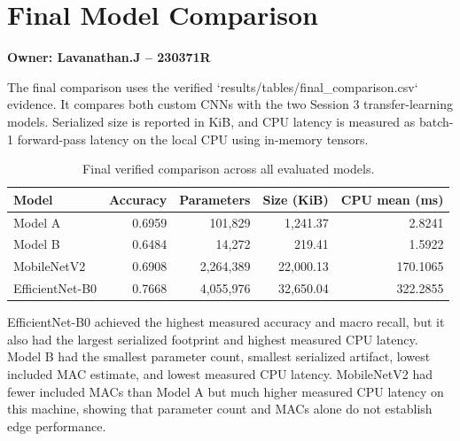 \section{Final Model Comparison}
\textbf{Owner: Lavanathan.J -- 230371R}

The final comparison uses the verified `results/tables/final_comparison.csv` evidence. It compares both custom CNNs with the two Session 3 transfer-learning models. Serialized size is reported in KiB, and CPU latency is measured as batch-1 forward-pass latency on the local CPU using in-memory tensors.

\begin{table}[H]
\centering
\caption{Final verified comparison across all evaluated models.}
\label{tab:final_comparison}
\small
\begin{tabularx}{\linewidth}{lrrrr}
\toprule
Model & Accuracy & Parameters & Size (KiB) & CPU mean (ms) \\
\midrule
Model A & 0.6959 & 101,829 & 1,241.37 & 2.8241 \\
Model B & 0.6484 & 14,272 & 219.41 & 1.5922 \\
MobileNetV2 & 0.6908 & 2,264,389 & 22,000.13 & 170.1065 \\
EfficientNet-B0 & 0.7668 & 4,055,976 & 32,650.04 & 322.2855 \\
\bottomrule
\end{tabularx}
\end{table}

EfficientNet-B0 achieved the highest measured accuracy and macro recall, but it also had the largest serialized footprint and highest measured CPU latency. Model B had the smallest parameter count, smallest serialized artifact, lowest included MAC estimate, and lowest measured CPU latency. MobileNetV2 had fewer included MACs than Model A but much higher measured CPU latency on this machine, showing that parameter count and MACs alone do not establish edge performance.
